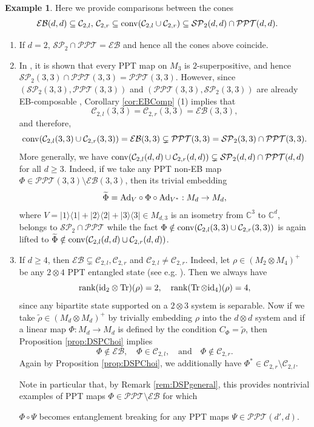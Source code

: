 \documentclass[11pt,reqno]{amsart}
\theoremstyle{definition}
\theoremstyle{definition}
\theoremstyle{definition}
\newtheorem{example}[theorem]{Example}
\theoremstyle{definition}
\newcommand{\la}{\langle}
\newcommand{\ra}{\rangle}
\newcommand{\Comp}{\mathbb{C}}
\newcommand{\id}{\mathrm{id}}
\newcommand{\SP}{\mathcal{SP}}
\newcommand{\EB}{\mathcal{EB}}
\newcommand{\PPT}{\mathcal{PPT}}
\newcommand{\Ad}{{\rm Ad}}
\begin{document}
\begin{example}
Here we provide comparisons between the cones 
    $$\EB(d,d)\subseteq \mathcal{C}_{2,l}, \,\mathcal{C}_{2,r}\subseteq{\rm conv}(\mathcal{C}_{2,l}\cup \mathcal{C}_{2,r}) \subseteq \SP_2(d,d) \cap \PPT(d,d).$$
\begin{enumerate}
    \item If $d=2$, $\SP_2\cap \PPT = \EB$ and hence all the cones above coincide.
    
    \item In \cite{CYT19,YLT16}, it is shown that every PPT map  on $M_3$ is $2$-superpositive, and hence $\SP_2(3,3)\cap \PPT(3,3) = \PPT(3,3)$. However, since $(\SP_2(3,3), \PPT(3,3))$ and $(\PPT(3,3), \SP_2(3,3))$ are already EB-composable \cite{CYT19}, Corollary \ref{cor:EBComp} (1) implies that
        $$\mathcal{C}_{2,l}(3,3) = \mathcal{C}_{2,r}(3,3) = \EB(3,3),$$
    and therefore,
        $${\rm conv}(\mathcal{C}_{2,l}(3,3)\cup \mathcal{C}_{2,r}(3,3)) = \EB(3,3)\subsetneq \PPT(3,3)=\SP_2(3,3)\cap \PPT(3,3).$$
    More generally, we have ${\rm conv}(\mathcal{C}_{2,l}(d,d)\cup \mathcal{C}_{2,r}(d,d))\subsetneq \SP_2(d,d)\cap \PPT(d,d)$ for all $d\geq 3$. Indeed, if we take any PPT non-EB map $\Phi\in \PPT(3,3)\setminus \EB(3,3)$, then its trivial embedding
        $$\widetilde{\Phi}=\Ad_{V}\circ \Phi \circ \Ad_{V^*}:M_d\to M_d,$$
    where $V=|1\ra\la 1|+|2\ra\la 2| + |3\ra\la 3|\in M_{d,3}$ is an isometry from $\Comp^3$ to $\Comp^d$, belongs to $\SP_2\cap \PPT$ while the fact $\Phi\notin {\rm conv}(\mathcal{C}_{2,l}(3,3)\cup \mathcal{C}_{2,r}(3,3))$ is again lifted to $\widetilde{\Phi}\notin {\rm conv}(\mathcal{C}_{2,l}(d,d)\cup \mathcal{C}_{2,r}(d,d))$.

    \item If $d\geq 4$, then $\EB\subsetneq \mathcal{C}_{2,l}, \mathcal{C}_{2,r}$ and $\mathcal{C}_{2,l}\neq \mathcal{C}_{2,r}$. Indeed, let $\rho\in (M_2\otimes M_4)^+$ be any $2\otimes 4$ PPT entangled state (see e.g. \cite{Wor76,Hor97}). Then we always have
        $$\rank (\id_2\otimes \Tr)(\rho)=2, \quad \rank(\Tr\otimes \id_4)(\rho)=4,$$
    since any bipartite state supported on a $2\otimes 3$ system is separable. Now if we take $\widetilde{\rho}\in (M_d\otimes M_d)^+$ by trivially embedding $\rho$ into the $d\otimes d$ system and if a linear map $\Phi:M_d\to M_d$ is defined by the condition $C_{\Phi}=\widetilde{\rho}$, then Proposition \ref{prop:DSPChoi} implies 
        $$\Phi\notin \EB, \quad \Phi\in \mathcal{C}_{2,l}, \quad \text{and} \quad \Phi\notin \mathcal{C}_{2,r}.$$
    Again by Proposition \ref{prop:DSPChoi}, we additionally have $\Phi^*\in \mathcal{C}_{2,r}\setminus \mathcal{C}_{2,l}$.
    
    Note in particular that, by Remark \ref{rem:DSPgeneral}, this provides nontrivial examples of PPT maps $\Phi\in \PPT\setminus \EB$ for which
    \begin{center}
        $\Phi\circ \Psi$ becomes entanglement breaking for any PPT maps $\Psi\in \PPT(d',d)$.
    \end{center}
\end{enumerate}
\end{example}
\end{document}
